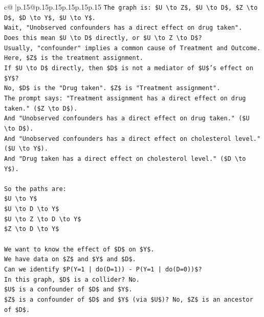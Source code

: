 \documentclass{article}
\begin{document}
{\begin{supertabular}{c@{$\;$}|p{.15\linewidth}@{}p{.15\linewidth}p{.15\linewidth}p{.15\linewidth}p{.15\linewidth}p{.15\linewidth}}
{{{\texttt{The graph is: \$U \textbackslash{}to Z\$, \$U \textbackslash{}to D\$, \$Z \textbackslash{}to D\$, \$D \textbackslash{}to Y\$, \$U \textbackslash{}to Y\$.} \\
\texttt{Wait, "Unobserved confounders has a direct effect on drug taken".} \\
\texttt{Does this mean \$U \textbackslash{}to D\$ directly, or \$U \textbackslash{}to Z \textbackslash{}to D\$?} \\
\texttt{Usually, "confounder" implies a common cause of Treatment and Outcome. Here, \$Z\$ is the treatment assignment.} \\
\texttt{If \$U \textbackslash{}to D\$ directly, then \$D\$ is not a mediator of \$U\$'s effect on \$Y\$?} \\
\texttt{No, \$D\$ is the "Drug taken". \$Z\$ is "Treatment assignment".} \\
\texttt{The prompt says: "Treatment assignment has a direct effect on drug taken." (\$Z \textbackslash{}to D\$).} \\
\texttt{And "Unobserved confounders has a direct effect on drug taken." (\$U \textbackslash{}to D\$).} \\
\texttt{And "Unobserved confounders has a direct effect on cholesterol level." (\$U \textbackslash{}to Y\$).} \\
\texttt{And "Drug taken has a direct effect on cholesterol level." (\$D \textbackslash{}to Y\$).} \\
\\ 
\texttt{So the paths are:} \\
\texttt{\$U \textbackslash{}to Y\$} \\
\texttt{\$U \textbackslash{}to D \textbackslash{}to Y\$} \\
\texttt{\$U \textbackslash{}to Z \textbackslash{}to D \textbackslash{}to Y\$} \\
\texttt{\$Z \textbackslash{}to D \textbackslash{}to Y\$} \\
\\ 
\texttt{We want to know the effect of \$D\$ on \$Y\$.} \\
\texttt{We have data on \$Z\$ and \$Y\$ and \$D\$.} \\
\texttt{Can we identify \$P(Y=1 | do(D=1)) {-} P(Y=1 | do(D=0))\$?} \\
\texttt{In this graph, \$D\$ is a collider? No.} \\
\texttt{\$U\$ is a confounder of \$D\$ and \$Y\$.} \\
\texttt{\$Z\$ is a confounder of \$D\$ and \$Y\$ (via \$U\$)? No, \$Z\$ is an ancestor of \$D\$.} \\
}}}
\end{supertabular}}
\end{document}
